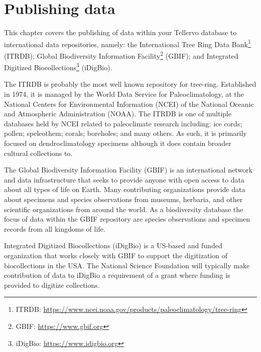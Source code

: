 
\chapter{Publishing data}

This chapter covers the publishing of data within your Tellervo database to international data repositories, namely: the International Tree Ring Data Bank\footnote{ITRDB: \url{https://www.ncei.noaa.gov/products/paleoclimatology/tree-ring}} (ITRDB); Global Biodiversity Information Facility\footnote{GBIF: \url{https://www.gbif.org}} (GBIF); and Integrated Digitized Biocollections\footnote{iDigBio: \url{https://www.idigbio.org}} (iDigBio).

The ITRDB is probably the most well known repository for tree-ring.  Established in 1974, it is managed by the World Data Service for Paleoclimatology, at the National Centers for Environmental Information (NCEI) of the National Oceanic and Atmospheric Administration (NOAA).  The ITRDB is one of multiple databases held by NCEI related to paleoclimate research including: ice cords; pollen; speleothem; corals; boreholes; and many others.  As such, it is primarily focused on dendroclimatology specimens although it does contain broader cultural collections to.

The Global Biodiversity Information Facility (GBIF) is an international network and data infrastructure that seeks to provide anyone with open access to data about all types of life on Earth.  Many contributing organizations provide data about specimens and species observations from museums, herbaria, and other scientific organizations from around the world.  As a biodiversity database the focus of data within the GBIF repository are species observations and specimen records from all kingdoms of life. 

Integrated Digitized Biocollections (iDigBio) is a US-based and funded organization that works closely with GBIF to support the digitization of biocollections in the USA.  The National Science Foundation will typically make contribution of data to iDigBio a requirement of a grant where funding is provided to digitize collections.  

